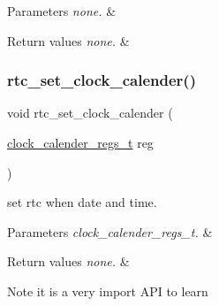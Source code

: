\begin{DoxyParams}{Parameters}
{\em none.} & \\
\hline
\end{DoxyParams}

\begin{DoxyRetVals}{Return values}
{\em none.} & \\
\hline
\end{DoxyRetVals}
\mbox{\label{group___r_t_c_gaa3c47a6523ac3f2f446ff6e99ab92c5e}} 
\subsubsection{\texorpdfstring{rtc\+\_\+set\+\_\+clock\+\_\+calender()}{rtc\_set\_clock\_calender()}}
{\footnotesize\ttfamily void rtc\+\_\+set\+\_\+clock\+\_\+calender (\begin{DoxyParamCaption}\item[{\hyperlink{struct__clock__calender__regs__t__}{clock\+\_\+calender\+\_\+regs\+\_\+t}}]{reg }\end{DoxyParamCaption})}



set rtc when date and time. 


\begin{DoxyParams}{Parameters}
{\em clock\+\_\+calender\+\_\+regs\+\_\+t.} & \\
\hline
\end{DoxyParams}

\begin{DoxyRetVals}{Return values}
{\em none.} & \\
\hline
\end{DoxyRetVals}
\begin{DoxyNote}{Note}
it is a very import A\+PI to learn 
\end{DoxyNote}
